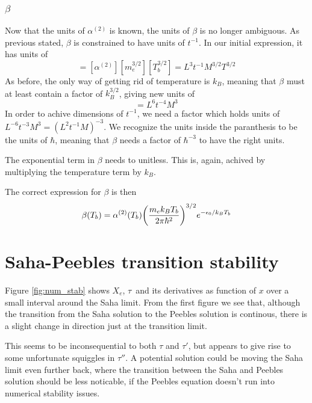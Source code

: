 \documentclass[10pt, a4paper]{article}
\begin{document}
\subsubsection{\texorpdfstring{\textbf{$\beta$}}{TEXT} }
Now that the units of $\alpha^{(2)}$ is known, the units of $\beta$ is no longer ambiguous. As previous stated, $\beta$ is constrained to have units of $t^{-1}$. In our initial expression, it has units of
\begin{equation*}
    [\beta] = [\alpha^{(2)}][m_e^{3/2}][T_b^{3/2}] = L^3t^{-1}M^{3/2}T^{3/2}
\end{equation*}
As before, the only way of getting rid of temperature is $k_B$, meaning that $\beta$ must at least contain a factor of $k_B^{3/2}$, giving new units of
\begin{equation*}
    [\beta][k_B^{3/2}] = L^6t^{-4}M^3
\end{equation*}
In order to achive dimensions of $t^{-1}$, we need a factor which holds units of $L^{-6}t^{-3}M^3 = (L^2t^{-1}M)^{-3}$. We recognize the units inside the paranthesis to be the units of $\hbar$, meaning that $\beta$ needs a factor of $\hbar^{-3}$ to have the right units.

The exponential term in $\beta$ needs to unitless. This is, again, achived by multiplying the temperature term by $k_B$.

The correct expression for $\beta$ is then
\begin{equation*}
    \beta\qty(T_{b}) = \alpha^{(2)}\qty(T_{b}) \qty(\frac{m_{e} k_B T_{b}}{2 \pi \hbar^2})^{3 / 2} e^{-\epsilon_{0} / k_BT_{b}}
\end{equation*}



\section{Saha-Peebles transition stability}
Figure \ref{fig:num_stab} shows $X_e$, $\tau$ and its derivatives as function of $x$ over a small interval around the Saha limit. From the first figure we see that, although the transition from the Saha solution to the Peebles solution is continous, there is a slight change in direction just at the transition limit.

This seems to be inconsequential to both $\tau$ and $\tau'$, but appears to give rise to some unfortunate squiggles in $\tau''$. A potential solution could be moving the Saha limit even further back, where the transition between the Saha and Peebles solution should be less noticable, if the Peebles equation doesn't run into numerical stability issues.
\end{document}
